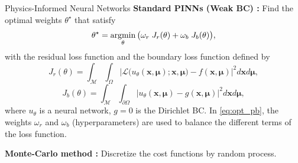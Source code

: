 \begin{frame}{Physics-Informed Neural Networks}
	\textbf{Standard PINNs (Weak BC) :} Find the optimal weights $\theta^\star$ that satisfy
	\begin{equation}
		\label{eq:opt_pb}
		\theta^\star = \operatorname*{argmin}_{\theta}	\big( \omega_r \; J_r(\theta) + \omega_b \; J_b(\theta) \big),
	\end{equation}
	with the residual loss function and the boundary loss function defined by
	\begin{equation*}
		J_r(\theta) =
		\int_{\mathcal{M}}\int_{\Omega}
		\big| \mathcal{L}\big(u_\theta(\bm{x},\bm{\mu});\bm{x},\bm{\mu}\big)-f(\bm{x},\bm{\mu}) \big|^2 d\bm{x} d\bm{\mu},
	\end{equation*}
	\begin{equation*}
		J_b(\theta) =
		\int_{\mathcal{M}}\int_{\partial \Omega} \big| u_\theta(\bm{x},\bm{\mu}) - g(\bm{x},\bm{\mu}) \big|^2 d\bm{x} d\bm{\mu},
	\end{equation*}
	where $u_\theta$ is a neural network, $g=0$ is the Dirichlet BC. In \eqref{eq:opt_pb}, the weights $\omega_r$ and $\omega_b$ (hyperparameters) are used to balance the different terms of the loss function.

	\vspace{5pt}
	\textbf{Monte-Carlo method :} Discretize the cost functions by random process.
\end{frame}

